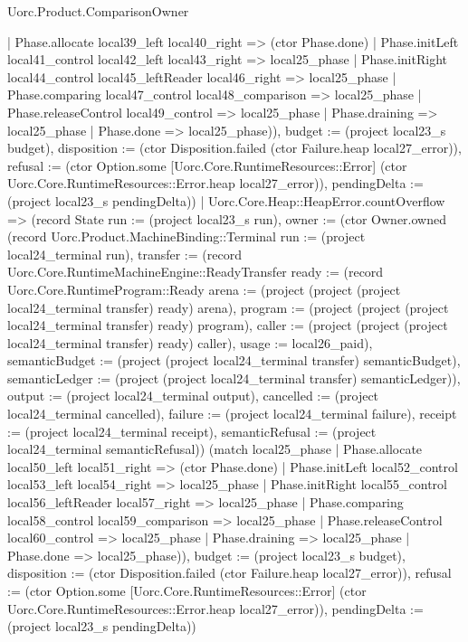 \begin{lexlean}{Uorc.Product.ComparisonOwner}
\begin{semanticmodule}
{{      | Phase.allocate local39_left local40_right => (ctor Phase.done)
      | Phase.initLeft local41_control local42_left local43_right => local25_phase
      | Phase.initRight local44_control local45_leftReader local46_right => local25_phase
      | Phase.comparing local47_control local48_comparison => local25_phase
      | Phase.releaseControl local49_control => local25_phase
      | Phase.draining => local25_phase
      | Phase.done => local25_phase)), budget := (project local23_s budget), disposition := (ctor Disposition.failed (ctor Failure.heap local27_error)), refusal := (ctor Option.some [Uorc.Core.RuntimeResources::Error] (ctor Uorc.Core.RuntimeResources::Error.heap local27_error)), pendingDelta := (project local23_s pendingDelta)})
    | Uorc.Core.Heap::HeapError.countOverflow => (record State {run := (project local23_s run), owner := (ctor Owner.owned (record Uorc.Product.MachineBinding::Terminal {run := (project local24_terminal run), transfer := (record Uorc.Core.RuntimeMachineEngine::ReadyTransfer {ready := (record Uorc.Core.RuntimeProgram::Ready {arena := (project (project (project local24_terminal transfer) ready) arena), program := (project (project (project local24_terminal transfer) ready) program), caller := (project (project (project local24_terminal transfer) ready) caller), usage := local26_paid}), semanticBudget := (project (project local24_terminal transfer) semanticBudget), semanticLedger := (project (project local24_terminal transfer) semanticLedger)}), output := (project local24_terminal output), cancelled := (project local24_terminal cancelled), failure := (project local24_terminal failure), receipt := (project local24_terminal receipt), semanticRefusal := (project local24_terminal semanticRefusal)}) (match local25_phase
      | Phase.allocate local50_left local51_right => (ctor Phase.done)
      | Phase.initLeft local52_control local53_left local54_right => local25_phase
      | Phase.initRight local55_control local56_leftReader local57_right => local25_phase
      | Phase.comparing local58_control local59_comparison => local25_phase
      | Phase.releaseControl local60_control => local25_phase
      | Phase.draining => local25_phase
      | Phase.done => local25_phase)), budget := (project local23_s budget), disposition := (ctor Disposition.failed (ctor Failure.heap local27_error)), refusal := (ctor Option.some [Uorc.Core.RuntimeResources::Error] (ctor Uorc.Core.RuntimeResources::Error.heap local27_error)), pendingDelta := (project local23_s pendingDelta)})
}
\end{semanticmodule}
\end{lexlean}
